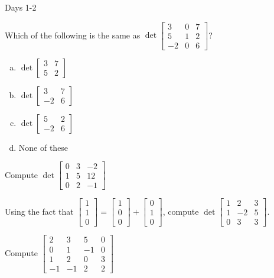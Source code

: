 \begin{applicationActivities}{Days 1-2}
\begin{activity}
  Which of the following is the same as $\det \begin{bmatrix} 3 & 0 & 7 \\  5 & 1 & 2 \\  -2 & 0 & 6 \end{bmatrix}$?
\begin{enumerate}[(a)]
\item $\det \begin{bmatrix} 3 & 7 \\ 5 & 2 \end{bmatrix}$
\item $\det \begin{bmatrix} 3 & 7 \\ -2 & 6 \end{bmatrix}$
\item $\det \begin{bmatrix} 5 & 2 \\ -2 & 6 \end{bmatrix}$
\item None of these
\end{enumerate}
\end{activity}

\begin{activity}
  Compute $\det \begin{bmatrix} 0 & 3 & -2 \\ 1 & 5 & 12 \\ 0 & 2 & -1 \end{bmatrix}$
\end{activity}

\begin{activity}
   Using the fact that $\begin{bmatrix} 1 \\ 1 \\ 0 \end{bmatrix} = \begin{bmatrix} 1 \\ 0 \\ 0 \end{bmatrix} + \begin{bmatrix} 0 \\ 1 \\ 0 \end{bmatrix}$, compute $\det \begin{bmatrix} 1 & 2 & 3 \\ 1 & -2 & 5 \\ 0 & 3 & 3 \end{bmatrix}$.
\end{activity}

\begin{activity}
   Compute $\begin{bmatrix} 2 & 3 & 5 & 0 \\ 0 & 1 & -1 & 0 \\ 1 & 2 & 0 & 3 \\ -1 & -1 & 2 & 2 \end{bmatrix}$
\end{activity}

\end{applicationActivities}
